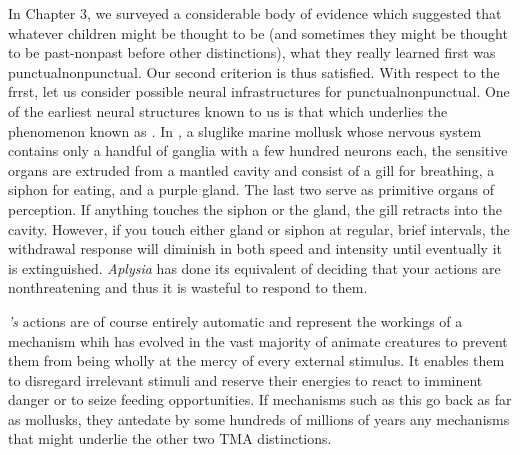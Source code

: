 In Chapter 3, we surveyed a considerable body of evidence which suggested that whatever children might be thought to be  (and sometimes they might be thought to be  past-nonpast before other distinctions), what they really learned first was punctual\-nonpunctual. Our second criterion is thus satisfied. With respect to the frrst, let us consider possible neural infrastructures for punctual\-nonpunctual. One of the earliest neural structures known to us is that which underlies the phenomenon known as \textit{. }In \textit{,} a sluglike marine mollusk whose nervous system contains only a hand\-ful of ganglia with a few hundred neurons each, the sensitive organs are extruded from a mantled cavity and consist of a gill for breathing, a siphon for eating, and a purple gland. The last two serve as primitive organs of perception. If anything touches the siphon or the gland, the gill retracts into the cavity. However, if you touch either gland or siphon at regular, brief intervals, the withdrawal response will diminish in both speed and intensity until eventually it is extinguished. \textit{Aplysia} has done its equivalent of deciding that your actions are nonthreatening and thus it is wasteful to respond to them.

\textit{'s} actions are of course entirely automatic and represent the workings of a mechanism whih has evolved in the vast majority of
animate creatures to prevent them from being wholly at the mercy of every external stimulus. It enables them to disregard irrelevant stimuli and reserve their energies to react to imminent danger or to seize feeding opportunities. If mechanisms such as this go back as far as mollusks, they antedate by some hundreds of millions of years any mechanisms that might underlie the other two TMA distinctions.

